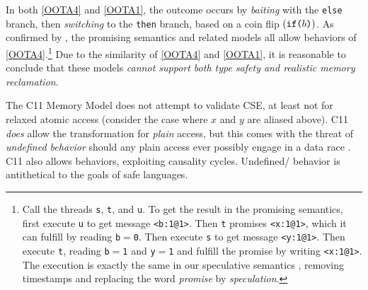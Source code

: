 In both \ref{OOTA4} and \ref{OOTA1}, the \oota{} outcome occurs by
\emph{baiting} with the \texttt{else} branch, then \emph{switching} to the
\texttt{then} branch, based on a coin flip $(\texttt{if}\allowbreak\texttt{(}b\texttt{)})$.  As confirmed by
\cite{kang,soham}, the promising semantics \cite{DBLP:conf/popl/KangHLVD17}
and related models
\citep{DBLP:conf/esop/JagadeesanPR10,DBLP:journals/pacmpl/ChakrabortyV19,Manson:2005:JMM:1047659.1040336}
all allow \oota{} behaviors of \ref{OOTA4}.\footnote{Call the threads
  \texttt{s}, \texttt{t}, and \texttt{u}.  To get the result in the promising
  semantics, first execute \texttt{u} to get message \texttt{<b:1@1>}.  Then
  \texttt{t} promises \texttt{<x:1@1>}, which it can fulfill by reading
  \texttt{b}$=$\texttt{0}.  Then execute \texttt{s} to get message \texttt{<y:1@1>}.
  Then execute \texttt{t}, reading \texttt{b}$=$\texttt{1} and \texttt{y}$=$\texttt{1} and
  fulfill the promise by writing \texttt{<x:1@1>}. The execution is exactly
  the same in our speculative semantics \cite{DBLP:conf/esop/JagadeesanPR10},
  removing timestamps and replacing the word \emph{promise} by \emph{speculation}.}  Due
to the similarity of \ref{OOTA4} and \ref{OOTA1}, it is reasonable to
conclude that these models \emph{cannot support both type safety and
  realistic memory reclamation}.




The C11 Memory Model \cite{Batty:2011:MCC:1926385.1926394} does not attempt
to validate CSE, at least not for relaxed atomic access (consider the case
where $x$ and $y$ are aliased above).  C11 \emph{does} allow the
transformation for \emph{plain} access, but this comes with the threat of
\emph{undefined behavior} should any plain access ever possibly engage in a
data race \cite{undefined}.  C11 also allows \oota{} behaviors, exploiting
causality cycles.  Undefined/\oota{} behavior is antithetical to the goals of
safe languages.


